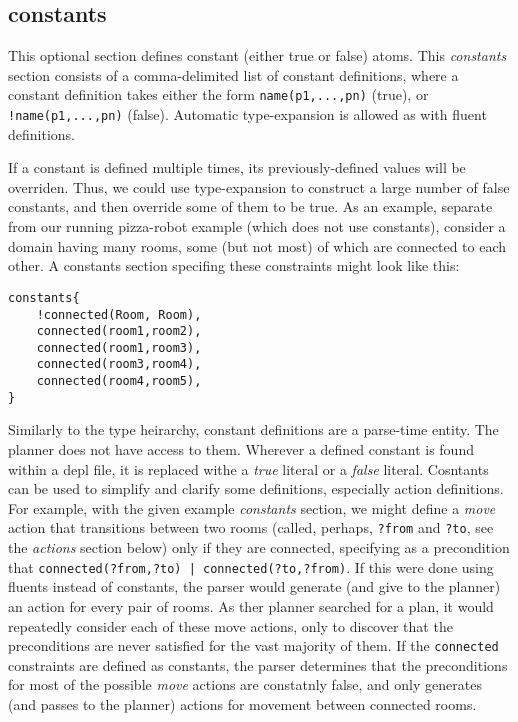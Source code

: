 \documentclass{article}
\begin{document}
\subsection{constants}

This optional section defines constant (either true or false) atoms. This
\emph{constants} section consists of a comma-delimited list of constant
definitions, where a constant definition takes either the form
\verb|name(p1,...,pn)| (true), 
or
\verb|!name(p1,...,pn)| (false).
Automatic type-expansion is allowed as with fluent definitions.

If a constant is defined multiple times, its previously-defined values will be
overriden. Thus, we could use type-expansion to construct
a large number of false constants, and then
override some of them to be true. As an example, separate from our
running pizza-robot example (which does not use constants), consider a domain
having many rooms, some (but not most) of which are connected to each other.
A constants section specifing these constraints might look like this:

\begin{verbatim}
constants{
    !connected(Room, Room),
    connected(room1,room2),
    connected(room1,room3),
    connected(room3,room4),
    connected(room4,room5),
}
\end{verbatim}

Similarly to the type heirarchy, constant definitions are a parse-time entity.
The planner does not have access to them.
Wherever a defined constant is found within a depl file, it is replaced withe a
\emph{true} literal or a
\emph{false} literal.  Cosntants can be used to simplify and clarify some definitions,
especially action definitions. For example, with the given example
\emph{constants} section, we might define a \emph{move} action that transitions
between two rooms (called, perhaps, \verb|?from| and \verb|?to|, see the
\emph{actions} section below) only if they are connected, specifying as a
precondition that \verb"connected(?from,?to) | connected(?to,?from)".  If this
were done using fluents instead of constants,
the parser would generate (and give to the planner) an
action for every pair of rooms. As ther planner searched for a plan, it
would repeatedly consider each of these move actions, only to discover that the
preconditions are never satisfied for the vast majority of them. If
the \verb|connected| constraints are defined as constants, the parser determines that
the preconditions for most of the possible \emph{move} actions are constatnly
false, and only generates (and passes to the planner) actions for movement
between connected rooms.
\end{document}
